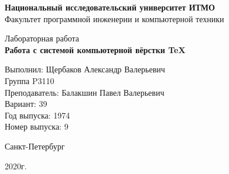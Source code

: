 \thispagestyle{empty}
\begin{center}
    {\bfseries Национальный исследовательский университет ИТМО}\\
    Факультет программной инженерии и компьютерной техники

    \vspace{30em}

    {\large Лабораторная работа }\\
    {\Large \textbf{Работа с системой компьютерной вёрстки \TeX}}
\end{center}

\vspace{20em}

\begin{flushright}
    Выполнил:
    Щербаков Александр Валерьевич\\
    Группа P3110\\
    Преподаватель:
    Балакшин Павел Валерьевич\\
    Вариант: 39\\
    Год выпуска: 1974\\
    Номер выпуска: 9 \\
\end{flushright}

\vspace{\fill}

\begin{center}
Санкт-Петербург

2020г.
\end{center}